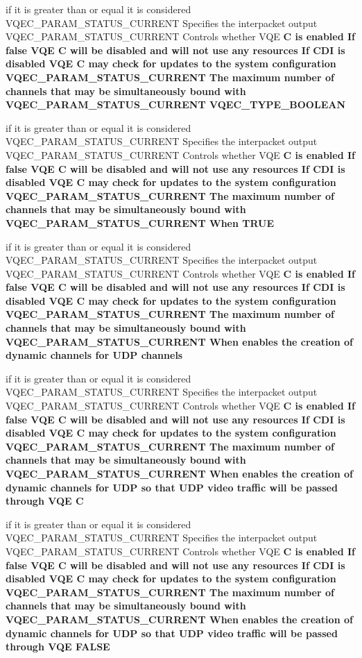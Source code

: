 \begin{CompactItemize}
\item 
if it is greater than or equal it is considered VQEC\_\-PARAM\_\-STATUS\_\-CURRENT Specifies the interpacket output VQEC\_\-PARAM\_\-STATUS\_\-CURRENT Controls whether VQE \bf{C} is enabled If false VQE \bf{C} will be disabled and will not use any resources If CDI is disabled VQE \bf{C} may check for updates \bf{to} the system configuration VQEC\_\-PARAM\_\-STATUS\_\-CURRENT The maximum number of \bf{channels} that may be simultaneously bound with VQEC\_\-PARAM\_\-STATUS\_\-CURRENT \bf{VQEC\_\-TYPE\_\-BOOLEAN}
\item 
if it is greater than or equal it is considered VQEC\_\-PARAM\_\-STATUS\_\-CURRENT Specifies the interpacket output VQEC\_\-PARAM\_\-STATUS\_\-CURRENT Controls whether VQE \bf{C} is enabled If false VQE \bf{C} will be disabled and will not use any resources If CDI is disabled VQE \bf{C} may check for updates \bf{to} the system configuration VQEC\_\-PARAM\_\-STATUS\_\-CURRENT The maximum number of \bf{channels} that may be simultaneously bound with VQEC\_\-PARAM\_\-STATUS\_\-CURRENT When \bf{TRUE}
\item 
if it is greater than or equal it is considered VQEC\_\-PARAM\_\-STATUS\_\-CURRENT Specifies the interpacket output VQEC\_\-PARAM\_\-STATUS\_\-CURRENT Controls whether VQE \bf{C} is enabled If false VQE \bf{C} will be disabled and will not use any resources If CDI is disabled VQE \bf{C} may check for updates \bf{to} the system configuration VQEC\_\-PARAM\_\-STATUS\_\-CURRENT The maximum number of \bf{channels} that may be simultaneously bound with VQEC\_\-PARAM\_\-STATUS\_\-CURRENT When enables the creation of dynamic \bf{channels} for UDP \bf{channels}
\item 
if it is greater than or equal it is considered VQEC\_\-PARAM\_\-STATUS\_\-CURRENT Specifies the interpacket output VQEC\_\-PARAM\_\-STATUS\_\-CURRENT Controls whether VQE \bf{C} is enabled If false VQE \bf{C} will be disabled and will not use any resources If CDI is disabled VQE \bf{C} may check for updates \bf{to} the system configuration VQEC\_\-PARAM\_\-STATUS\_\-CURRENT The maximum number of \bf{channels} that may be simultaneously bound with VQEC\_\-PARAM\_\-STATUS\_\-CURRENT When enables the creation of dynamic \bf{channels} for UDP so that UDP video traffic will be passed through VQE \bf{C}
\item 
if it is greater than or equal it is considered VQEC\_\-PARAM\_\-STATUS\_\-CURRENT Specifies the interpacket output VQEC\_\-PARAM\_\-STATUS\_\-CURRENT Controls whether VQE \bf{C} is enabled If false VQE \bf{C} will be disabled and will not use any resources If CDI is disabled VQE \bf{C} may check for updates \bf{to} the system configuration VQEC\_\-PARAM\_\-STATUS\_\-CURRENT The maximum number of \bf{channels} that may be simultaneously bound with VQEC\_\-PARAM\_\-STATUS\_\-CURRENT When enables the creation of dynamic \bf{channels} for UDP so that UDP video traffic will be passed through VQE \bf{FALSE}

\end{CompactItemize}
